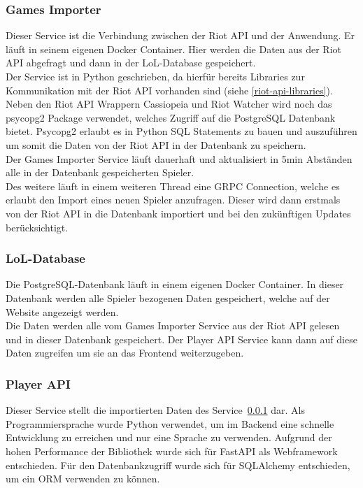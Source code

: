 \subsubsection{Games Importer}\label{subsubsec:games-importer}
Dieser Service ist die Verbindung zwischen der Riot API und der Anwendung. Er läuft in seinem eigenen Docker Container. Hier werden die Daten aus der Riot API abgefragt und dann in der LoL-Database gespeichert.\\
Der Service ist in Python geschrieben, da hierfür bereits Libraries zur Kommunikation mit der Riot API vorhanden sind (siehe \ref{riot-api-libraries}).\\
Neben den Riot API Wrappern Cassiopeia und Riot Watcher wird noch das psycopg2 Package verwendet, welches Zugriff auf die PostgreSQL Datenbank bietet. Psycopg2 erlaubt es in Python SQL Statements zu bauen und auszuführen um somit die Daten von der Riot API in der Datenbank zu speichern.\\
Der Games Importer Service läuft dauerhaft und aktualisiert in 5min Abständen alle in der Datenbank gespeicherten Spieler. \\
Des weitere läuft in einem weiteren Thread eine GRPC Connection, welche es erlaubt den Import eines neuen Spieler anzufragen. Dieser wird dann erstmals von der Riot API in die Datenbank importiert und bei den zukünftigen Updates berücksichtigt.

\subsubsection{LoL-Database}
Die PostgreSQL-Datenbank läuft in einem eigenen Docker Container. In dieser Datenbank werden alle Spieler bezogenen Daten gespeichert, welche auf der Website angezeigt werden.\\
Die Daten werden alle vom Games Importer Service aus der Riot API gelesen und in dieser Datenbank gespeichert. Der Player API Service kann dann auf diese Daten zugreifen um sie an das Frontend weiterzugeben.

\subsubsection{Player API}

Dieser Service stellt die importierten Daten des Service~\ref{subsubsec:games-importer} dar.
Als Programmiersprache wurde Python verwendet, um im Backend eine schnelle Entwicklung zu erreichen und nur eine Sprache zu verwenden.
Aufgrund der hohen Performance der Bibliothek wurde sich für FastAPI als Webframework entschieden.
Für den Datenbankzugriff wurde sich für SQLAlchemy entschieden, um ein ORM verwenden zu können.

